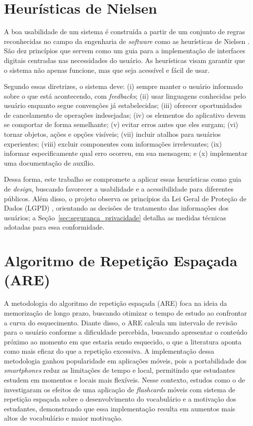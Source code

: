 \flushbottom
\clearpage
\section{Heurísticas de Nielsen}

A boa usabilidade de um sistema é construída a partir de um conjunto de regras reconhecidas no campo da engenharia de \textit{software} como as heurísticas de Nielsen \cite{nielsen_1994}.
São dez princípios que servem como um guia para a implementação de interfaces digitais centradas nas necessidades do usuário.
As heurísticas visam garantir que o sistema não apenas funcione, mas que seja acessível e fácil de usar.

Segundo essas diretrizes, o sistema deve: (i) sempre manter o usuário informado sobre o que está acontecendo, com \textit{feedbacks}; (ii) usar linguagens conhecidas pelo usuário enquanto segue convenções já estabelecidas; (iii) oferecer oportunidades de cancelamento de operações indesejadas; (iv) os elementos do aplicativo devem se comportar de forma semelhante; (v) evitar erros antes que eles surgam; (vi) tornar objetos, ações e opções visíveis; (vii) incluir atalhos para usuários experientes; (viii) excluir componentes com informações irrelevantes; (ix) informar especificamente qual erro ocorreu, em sua mensagem; e (x) implementar uma documentação de auxílio.

Dessa forma, este trabalho se compromete a aplicar essas heurísticas como guia de \textit{design}, buscando favorecer a usabilidade e a acessibilidade para diferentes públicos.
Além disso, o projeto observa os princípios da Lei Geral de Proteção de Dados (LGPD) \cite{brasil2018lgpd}, orientando as decisões de tratamento das informações dos usuários; a Seção~\ref{sec:seguranca_privacidade} detalha as medidas técnicas adotadas para essa conformidade.

\section{Algoritmo de Repetição Espaçada (ARE)}

A metodologia do algoritmo de repetição espaçada (ARE) foca na ideia da memorização de longo prazo, buscando otimizar o tempo de estudo ao confrontar a curva do esquecimento.
Diante disso, o ARE calcula um intervalo de revisão para o usuário conforme a dificuldade percebida, buscando apresentar o conteúdo próximo ao momento em que estaria sendo esquecido, o que a literatura aponta como mais eficaz do que a repetição excessiva.
A implementação dessa metodologia ganhou popularidade em aplicações móveis, pois a portabilidade dos \textit{smartphones} reduz as limitações de tempo e local, permitindo que estudantes estudem em momentos e locais mais flexíveis.
Nesse contexto, estudos como o de  investigaram os efeitos de uma aplicação de \textit{flashcards} móveis com sistema de repetição espaçada sobre o desenvolvimento do vocabulário e a motivação dos estudantes, demonstrando que essa implementação resulta em aumentos mais altos de vocabulário e maior motivação.

